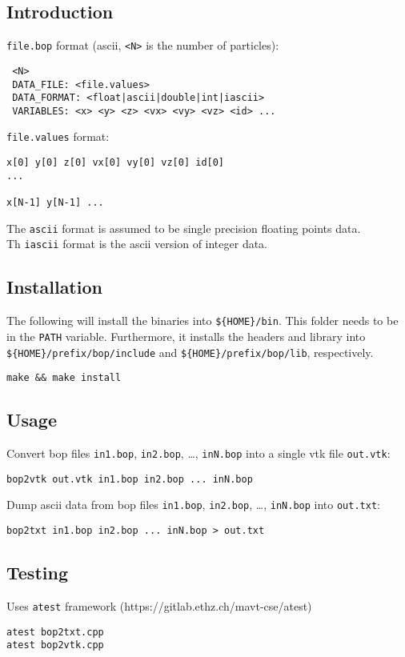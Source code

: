 \subsection{Introduction}\label{introduction}

\texttt{file.bop} format (ascii, \texttt{\textless{}N\textgreater{}} is
the number of particles):

\begin{verbatim}
 <N>
 DATA_FILE: <file.values>
 DATA_FORMAT: <float|ascii|double|int|iascii>
 VARIABLES: <x> <y> <z> <vx> <vy> <vz> <id> ...
\end{verbatim}

\texttt{file.values} format:

\begin{verbatim}
x[0] y[0] z[0] vx[0] vy[0] vz[0] id[0]
...

x[N-1] y[N-1] ...
\end{verbatim}

The \texttt{ascii} format is assumed to be single precision floating
points data.\\
Th \texttt{iascii} format is the ascii version of integer data.

\subsection{Installation}\label{installation}

The following will install the binaries into \texttt{\$\{HOME\}/bin}.
This folder needs to be in the \texttt{PATH} variable. Furthermore, it
installs the headers and library into
\texttt{\$\{HOME\}/prefix/bop/include} and
\texttt{\$\{HOME\}/prefix/bop/lib}, respectively.

\begin{verbatim}
make && make install
\end{verbatim}

\subsection{Usage}\label{usage}

Convert bop files \texttt{in1.bop}, \texttt{in2.bop}, \ldots{},
\texttt{inN.bop} into a single vtk file \texttt{out.vtk}:

\begin{verbatim}
bop2vtk out.vtk in1.bop in2.bop ... inN.bop
\end{verbatim}

Dump ascii data from bop files \texttt{in1.bop}, \texttt{in2.bop},
\ldots{}, \texttt{inN.bop} into \texttt{out.txt}:

\begin{verbatim}
bop2txt in1.bop in2.bop ... inN.bop > out.txt
\end{verbatim}

\subsection{Testing}\label{testing}

Uses \texttt{atest} framework (https://gitlab.ethz.ch/mavt-cse/atest)

\begin{verbatim}
atest bop2txt.cpp
atest bop2vtk.cpp
\end{verbatim}
